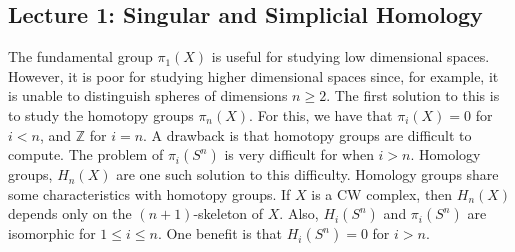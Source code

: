 \documentclass[crop=false,class=book,oneside]{standalone}
\begin{document}
    \subsection{Lecture 1: Singular and Simplicial Homology}
            The fundamental group $\pi_{1}(X)$ is useful for
            studying low dimensional spaces. However, it is poor for
            studying higher dimensional spaces since, for example,
            it is unable to distinguish spheres of dimensions
            $n\geq 2$. The first solution to this is to study
            the homotopy groups $\pi_{n}(X)$. For this, we have
            that $\pi_{i}(X)=0$ for $i<n$, and $\mathbb{Z}$ for
            $i=n$. A drawback is that homotopy groups are
            difficult to compute. The problem of $\pi_{i}(S^{n})$
            is very difficult for when $i>n$. Homology groups,
            $H_{n}(X)$ are one such solution to this difficulty.
            Homology groups share some characteristics with
            homotopy groups. If $X$ is a CW complex, then $H_{n}(X)$
            depends only on the $(n+1)$-skeleton of $X$. Also,
            $H_{i}(S^{n})$ and $\pi_{i}(S^{n})$ are isomorphic for
            $1\leq i\leq n$. One benefit is that $H_{i}(S^{n})=0$
            for $i>n$.
\end{document}
